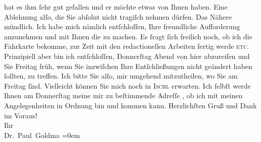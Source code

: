 \begin{ledgroupsized}[t]{13cm}
               hat es ihm ſehr gut gefallen und er möchte etwas \label{K_L02642-1v}\label{K_L02642-1h} von Ihnen haben. Eine Ablehnung alſo, die Sie abſolut {\pb}nicht tragiſch nehmen dürfen. Das
               Nähere mündlich.\pend
           \pstart
           Ich habe mich nämlich entſchloſſen, Ihre freundliche Aufforderung anzunehmen und mit
               Ihnen die \label{K_L02642-2v}\label{K_L02642-2h} zu machen. Es fragt ſich freilich noch,
               ob ich die Fahrkarte bekomme, zur Zeit mit den redactionellen Arbeiten fertig werde
                  \textsc{etc}. Prinzipiell aber bin ich entſchloſſen, Donnerſtag{ }Abend von hier
               abzureiſen und Sie Freitag{ }früh, wenn Sie inzwiſchen Ihre Entſchließungen nicht geändert haben
               ſollten, \label{K_L02642-4v}\label{K_L02642-4h} zu treffen. Ich bitte Sie
               alſo, mir umgehend mitzutheilen, wo Sie am Freitag
               ſind. {\pb}Vielleicht können Sie mich
               noch in \textsc{Ischl} erwarten. Ich ſelbſt werde Ihnen am Donnerſtag
               meine mir zu beſtimmende Adreſſe \label{K_L02642-3v}\label{K_L02642-3h}, ob ich mit meinen Angelegenheiten in Ordnung bin und kommen
               kann.\pend
           \pstart
           Herzlichſten Gruß und Dank im Voraus! {\\[\baselineskip]}Ihr {\\[\baselineskip]}\spacefill\mbox{Dr. Paul Goldma{\geminationn}}\pend
           \leftskip=0em{}\endnumbering{}\end{ledgroupsized}  \newcommand{\dateiname}{L02642}\newcommand{\titel}{Paul Goldmann an Arthur Schnitzler, 4. 8. 1889}\newcommand{\editorInnen}{Martin Anton Müller und Laura Untner}
            \footnotesize
\begin{ledgroupsized}[t]{11.5cm}
\end{ledgroupsized}
         
      